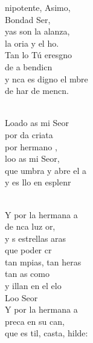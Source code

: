 \documentclass[12pt]{article}
\begin{document}
\begin{multicols*}{2}
\begin{cancion}%
	nipotente, Asimo,  \\
	Bondad Ser,\\
	yas son la alanza, \\
	la oria y el ho.\\
	Tan lo Tú eresgno  \\
	de a bendicn\\
	y nca es digno el mbre\\
	de har de mencn. \\\jump\\
	\begin{chorus}%
	Loado as mi Seor\\
	por da criata\\
	por  hermano ,\\
	loo as mi Seor,\\
	que umbra y abre el a \\
	y es llo en esplenr\\
	\end{chorus}%
	\jump\\
	Y por la hermana a\\
	de nca luz or,\\
	y s estrellas aras \\
	que  poder cr\\
	tan mpias, tan heras\\
	tan as como \\
	y illan en el elo\\
	Loo Seor\\
	Y por la hermana a \\
	preca en su can,\\
	que es til, casta, hilde: \\

\end{cancion}
\end{multicols*}
\end{document}
